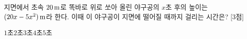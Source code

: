 지면에서 초속 $20\mkern3mu \mathrm{m}$로 똑바로 위로 쏘아 올린 야구공의 $x$초 후의 높이는 $(20x-5x^2)\mkern3mu \mathrm{m}$라 한다. 이때 이 야구공이 지면에 떨어질 때까지 걸리는 시간은? \mbox{[3점]}
\begin{choices32}{$1$초}{$2$초}{$3$초}{$4$초}{$5$초}\end{choices32}
